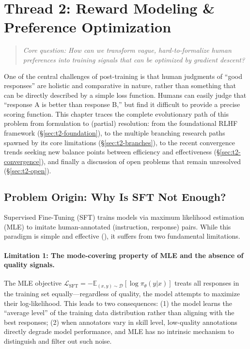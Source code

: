 \section{Thread 2: Reward Modeling \& Preference Optimization}
\label{sec:t2}

\begin{quote}
\textit{Core question: How can we transform vague, hard-to-formalize human preferences into training signals that can be optimized by gradient descent?}
\end{quote}

\noindent
One of the central challenges of post-training is that human judgments of ``good responses'' are holistic and comparative in nature,
rather than something that can be directly described by a simple loss function.
Humans can easily judge that ``response A is better than response B,'' but find it difficult to provide a precise scoring function.
This chapter traces the complete evolutionary path of this problem from formulation to (partial) resolution:
from the foundational RLHF framework (\S\ref{sec:t2-foundation}),
to the multiple branching research paths spawned by its core limitations (\S\ref{sec:t2-branches}),
to the recent convergence trends seeking new balance points between efficiency and effectiveness (\S\ref{sec:t2-convergence}),
and finally a discussion of open problems that remain unresolved (\S\ref{sec:t2-open}).

\subsection{Problem Origin: Why Is SFT Not Enough?}
\label{sec:t2-origin}

Supervised Fine-Tuning (SFT) trains models via maximum likelihood estimation (MLE) to imitate
human-annotated (instruction, response) pairs. While this paradigm is simple and effective (),
it suffers from two fundamental limitations.

\paragraph{Limitation 1: The mode-covering property of MLE and the absence of quality signals.}
The MLE objective $\mathcal{L}_{\text{SFT}} = -\mathbb{E}_{(x,y)\sim\mathcal{D}}\left[\log \pi_\theta(y|x)\right]$
treats all responses in the training set equally---regardless of quality, the model attempts to maximize their log-likelihood.
This leads to two consequences:
(1) the model learns the ``average level'' of the training data distribution rather than aligning with the best responses;
(2) when annotators vary in skill level, low-quality annotations directly degrade model performance,
and MLE has no intrinsic mechanism to distinguish and filter out such noise.

